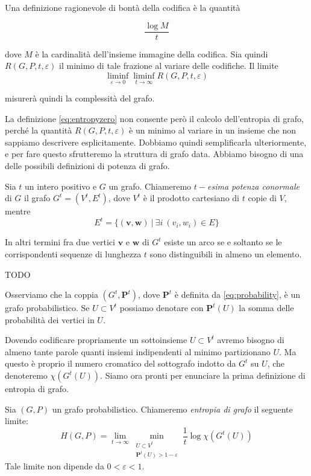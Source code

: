 Una definizione ragionevole di bontà della codifica è la quantità

\[\frac{\log{M}}{t}\]

dove \(M\) è la cardinalità dell'insieme immagine della codifica. Sia quindi \(R(G,P,t,\varepsilon)\) il minimo di tale frazione al variare delle codifiche. Il limite 
\begin{equation}
	\label{eq:entropyzero} \liminf_{\varepsilon \to 0} \liminf_{t \to \infty} R(G,P,t,\varepsilon) 
\end{equation}

misurerà quindi la complessità del grafo.

La definizione \eqref{eq:entropyzero} non consente però il calcolo dell'entropia di grafo, perché la quantità \(R(G,P,t,\varepsilon)\) è un minimo al variare in un insieme che non sappiamo descrivere esplicitamente. Dobbiamo quindi semplificarla ulteriormente, e per fare questo sfrutteremo la struttura di grafo data. Abbiamo bisogno di una delle possibili definizioni di potenza di grafo. 
\begin{definition}
	Sia \(t\) un intero positivo e \(G\) un grafo. Chiameremo \emph{\(t-\)esima potenza conormale} di \(G\) il grafo \(G^t=(V^t, E^t)\), dove \(V^t\) è il prodotto cartesiano di \(t\) copie di \(V\), mentre
	\[E^t=\{(\mathbf{v},\mathbf{w})\ \vert\ \exists i\ (v_i, w_i)\in E\}\]
\end{definition}

In altri termini fra due vertici \(\mathbf{v}\) e \(\mathbf{w}\) di \(G^t\) esiste un arco se e soltanto se le corrispondenti sequenze di lunghezza \(t\) sono distinguibili in almeno un elemento.

\begin{example}
  TODO
\end{example}
Osserviamo che la coppia \((G^t, \mathbf{P}^t)\), dove \(\mathbf{P}^t\) è definita da \eqref{eq:probability}, è un grafo probabilistico. Se \(U\subset V^{t}\) possiamo denotare con \(\mathbf{P}^t(U)\) la somma delle probabilità dei vertici in \(U\).

Dovendo codificare propriamente un sottoinsieme \(U\subset V^{t}\) avremo bisogno di almeno tante parole quanti insiemi indipendenti al minimo partizionano \(U\). Ma questo è proprio il numero cromatico del sottografo indotto da \(G^t\) su \(U\), che denoteremo \(\chi(G^t(U))\). Siamo ora pronti per enunciare la prima definizione di entropia di grafo. 
\begin{definition}
	Sia \((G,P)\) un grafo probabilistico. Chiameremo \emph{entropia di grafo} il seguente limite: 
	\begin{equation}
		\label{eq:entropyone} H(G,P)=\lim_{t\to \infty} \min_{\substack{ U\subset V^t\\\mathbf{P}^t(U)>1-\varepsilon}} \frac{1}{t}\log{\chi(G^t(U))} 
	\end{equation}
	Tale limite non dipende da \(0<\varepsilon <1\). 
\end{definition}

